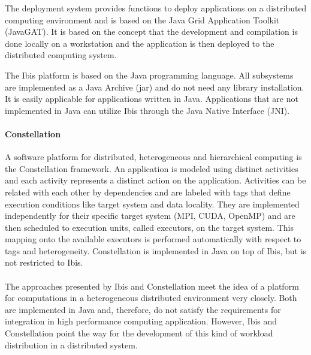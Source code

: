 The deployment system provides functions to deploy applications on a
distributed computing environment and is based on the Java Grid
Application Toolkit (JavaGAT).  It is based on the concept that the
development and compilation is done locally on a workstation and the
application is then deployed to the distributed computing system.

The Ibis platform is based on the Java programming language. All subsystems are implemented as
a Java Archive (jar) and do not need any library installation. It is easily
applicable for applications written in Java. Applications that are not implemented in Java 
can utilize Ibis through the Java Native Interface (JNI).

\paragraph*{Constellation}
A software platform for distributed, heterogeneous and hierarchical
computing is the Constellation \cite{ref:constellation} framework. An
application is modeled using distinct activities and each activity
represents a distinct action on the application.  Activities can be
related with each other by dependencies and are labeled with tags that
define execution conditions like target system and data locality.
They are implemented independently for their specific target system
(MPI, CUDA, OpenMP) and are then scheduled to execution units, called
executors, on the target system. This mapping onto the available
executors is performed automatically with respect to tags and
heterogeneity. Constellation is implemented in Java on top of Ibis,
but is not restricted to Ibis.

\paragraph*{}
The approaches presented by Ibis and Constellation meet the idea of a
platform for computations in a heterogeneous distributed environment
very closely. Both are implemented in Java and, therefore, do not
satisfy the requirements for integration in high performance computing
application. However, Ibis and Constellation point the way for the
development of this kind of workload distribution in a distributed
system.


\cleardoublepage

